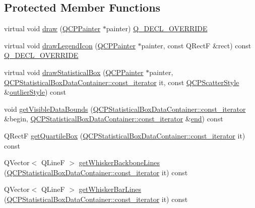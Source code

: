 \subsection*{Protected Member Functions}
\begin{DoxyCompactItemize}
\item 
virtual void \mbox{\hyperlink{class_q_c_p_statistical_box_afcff35fa79728cfe10e80e0702014fea}{draw}} (\mbox{\hyperlink{class_q_c_p_painter}{Q\+C\+P\+Painter}} $\ast$painter) \mbox{\hyperlink{qcustomplot_8h_a42cc5eaeb25b85f8b52d2a4b94c56f55}{Q\+\_\+\+D\+E\+C\+L\+\_\+\+O\+V\+E\+R\+R\+I\+DE}}
\item 
virtual void \mbox{\hyperlink{class_q_c_p_statistical_box_ad286c63a79c21d5231a4b6c6fdbb914f}{draw\+Legend\+Icon}} (\mbox{\hyperlink{class_q_c_p_painter}{Q\+C\+P\+Painter}} $\ast$painter, const Q\+RectF \&rect) const \mbox{\hyperlink{qcustomplot_8h_a42cc5eaeb25b85f8b52d2a4b94c56f55}{Q\+\_\+\+D\+E\+C\+L\+\_\+\+O\+V\+E\+R\+R\+I\+DE}}
\item 
virtual void \mbox{\hyperlink{class_q_c_p_statistical_box_a02dc6b561be8203d460d7263da74b8a9}{draw\+Statistical\+Box}} (\mbox{\hyperlink{class_q_c_p_painter}{Q\+C\+P\+Painter}} $\ast$painter, \mbox{\hyperlink{class_q_c_p_data_container_ae40a91f5cb0bcac61d727427449b7d15}{Q\+C\+P\+Statistical\+Box\+Data\+Container\+::const\+\_\+iterator}} it, const \mbox{\hyperlink{class_q_c_p_scatter_style}{Q\+C\+P\+Scatter\+Style}} \&\mbox{\hyperlink{class_q_c_p_statistical_box_aef92e38fcb8e5041a44c2e01886e3b66}{outlier\+Style}}) const
\item 
void \mbox{\hyperlink{class_q_c_p_statistical_box_a1c24e86384a4aced91d5216fce86b175}{get\+Visible\+Data\+Bounds}} (\mbox{\hyperlink{class_q_c_p_data_container_ae40a91f5cb0bcac61d727427449b7d15}{Q\+C\+P\+Statistical\+Box\+Data\+Container\+::const\+\_\+iterator}} \&begin, \mbox{\hyperlink{class_q_c_p_data_container_ae40a91f5cb0bcac61d727427449b7d15}{Q\+C\+P\+Statistical\+Box\+Data\+Container\+::const\+\_\+iterator}} \&\mbox{\hyperlink{myutils_8h_a64d77caddefed4b96fa62e3f5f73c9a2}{end}}) const
\item 
Q\+RectF \mbox{\hyperlink{class_q_c_p_statistical_box_aa44482bf991ceca74602294dd9977243}{get\+Quartile\+Box}} (\mbox{\hyperlink{class_q_c_p_data_container_ae40a91f5cb0bcac61d727427449b7d15}{Q\+C\+P\+Statistical\+Box\+Data\+Container\+::const\+\_\+iterator}} it) const
\item 
Q\+Vector$<$ Q\+LineF $>$ \mbox{\hyperlink{class_q_c_p_statistical_box_a233c28f8c2464ed104a4d580eedd4c64}{get\+Whisker\+Backbone\+Lines}} (\mbox{\hyperlink{class_q_c_p_data_container_ae40a91f5cb0bcac61d727427449b7d15}{Q\+C\+P\+Statistical\+Box\+Data\+Container\+::const\+\_\+iterator}} it) const
\item 
Q\+Vector$<$ Q\+LineF $>$ \mbox{\hyperlink{class_q_c_p_statistical_box_af478f6e8a5e9ca2f1bbac10a6b73319a}{get\+Whisker\+Bar\+Lines}} (\mbox{\hyperlink{class_q_c_p_data_container_ae40a91f5cb0bcac61d727427449b7d15}{Q\+C\+P\+Statistical\+Box\+Data\+Container\+::const\+\_\+iterator}} it) const
\end{DoxyCompactItemize}
